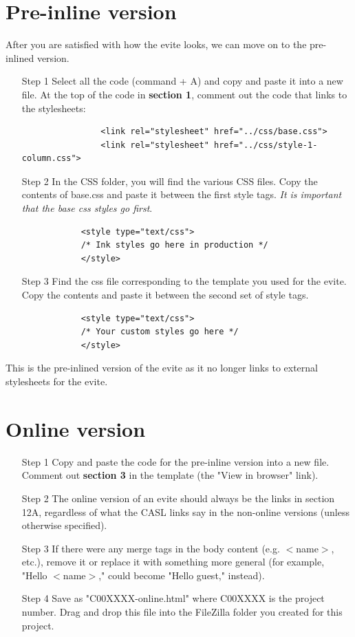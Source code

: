 \documentclass[a4paper,11pt]{article}
\begin{document}
	\section{Pre-inline version}
	After you are satisfied with how the evite looks, we can move on to the pre-inlined version.
	\begin{itemize}
		\item[Step 1] Select all the code (command +  A) and copy and paste it into a new file. At the top of the code in \textbf{section 1}, comment out the code that links to the stylesheets:
			\begin{verbatim}
				<link rel="stylesheet" href="../css/base.css">
				<link rel="stylesheet" href="../css/style-1-column.css">
			\end{verbatim}
		\item[Step 2] In the CSS folder, you will find the various CSS files. Copy the contents of base.css and paste it between the first style tags. \textit{It is important that the base css styles go first}.
			\begin{verbatim}
			<style type="text/css">
			/* Ink styles go here in production */
			</style>
			\end{verbatim}
		\item[Step 3] Find the css file corresponding to the template you used for the evite. Copy the contents and paste it between the second set of style tags. 
			\begin{verbatim}
			<style type="text/css">
			/* Your custom styles go here */
			</style>
			\end{verbatim}
	\end{itemize}
	This is the pre-inlined version of the evite as it no longer links to external stylesheets for the evite.
	
	\section{Online version}
	\begin{itemize}
		\item[Step 1] Copy and paste the code for the pre-inline version into a new file. Comment out \textbf{section 3} in the template (the "View in browser" link). 
		\item[Step 2] The online version of an evite should always be the links in section 12A, regardless of what the CASL links say in the non-online versions (unless otherwise specified).
		\item[Step 3] If there were any merge tags in the body content (e.g. $<$name$>$, etc.), remove it or replace it with something more general (for example, "Hello $<$name$>$," could become "Hello guest," instead). 
		\item[Step 4] Save as "C00XXXX-online.html" where C00XXXX is the project number. Drag and drop this file into the FileZilla folder you created for this project.
	\end{itemize}
	
\end{document}
